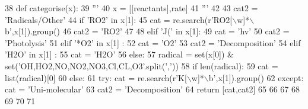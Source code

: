 \begin{DoxyCode}
38 \textcolor{keyword}{def }categorise(x):
39     \textcolor{stringliteral}{'''}
40 \textcolor{stringliteral}{    x = [[reactants],rate]}
41 \textcolor{stringliteral}{    '''}
42 
43     cat2 = \textcolor{stringliteral}{'Radicals/Other'}
44     \textcolor{keywordflow}{if} \textcolor{stringliteral}{'RO2'} \textcolor{keywordflow}{in} x[1]:
45         cat = re.search(\textcolor{stringliteral}{r'RO2[\(\backslash\)w]*\(\backslash\)b'},x[1]).group()
46         cat2 = \textcolor{stringliteral}{'RO2'}
47 
48     \textcolor{keywordflow}{elif} \textcolor{stringliteral}{'J('} \textcolor{keywordflow}{in} x[1]:
49         cat = \textcolor{stringliteral}{'hv'}
50         cat2 = \textcolor{stringliteral}{'Photolysis'}
51     \textcolor{keywordflow}{elif} \textcolor{stringliteral}{'*O2'} \textcolor{keywordflow}{in} x[1] :
52         cat = \textcolor{stringliteral}{'O2'}
53         cat2 = \textcolor{stringliteral}{'Decomposition'}
54     \textcolor{keywordflow}{elif} \textcolor{stringliteral}{'H2O'} \textcolor{keywordflow}{in} x[1] :
55         cat = \textcolor{stringliteral}{'H2O'}
56     \textcolor{keywordflow}{else}:
57         radical = set(x[0]) & set(\textcolor{stringliteral}{'OH,HO2,NO,NO2,NO3,Cl,CL,O3'}.split(\textcolor{stringliteral}{','}))
58         \textcolor{keywordflow}{if} len(radical):
59             cat = list(radical)[0]
60         \textcolor{keywordflow}{else}:
61             \textcolor{keywordflow}{try}: cat = re.search(\textcolor{stringliteral}{r'K[\(\backslash\)w]*\(\backslash\)b'},x[1]).group()
62             \textcolor{keywordflow}{except}: cat = \textcolor{stringliteral}{'Uni-molecular'}
63             cat2 = \textcolor{stringliteral}{'Decomposition'}
64     \textcolor{keywordflow}{return} [cat,cat2]
65 
66 
67 
68 
69 
70 
71 
\end{DoxyCode}
